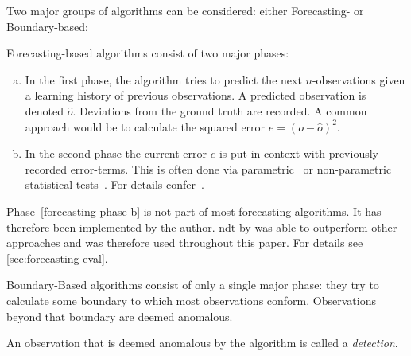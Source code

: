 Two major groups of algorithms can be considered: either Forecasting- or
Boundary-based:
\begin{definition}\label{def:forecasting-based-algo}
    Forecasting-based algorithms consist of two major phases:
    \begin{enumerate}[a.)]
        \item In the first phase, the algorithm tries to predict the next \(n\)-observations
        given a learning history of previous observations. A predicted observation
        is denoted \(\hat{o}\). Deviations from the ground truth are recorded.
        A common approach would be to calculate the squared error \(e = {\left(o - \hat{o}\right)}^2\).
        \item In the second phase the current-error \(e\) is put in context with
        previously recorded error-terms. This is often done via 
        parametric~\cite{Malhotra.2015,Ahmad.2017,Guo.2016,Malhotra.2016,Shipmon.2017,Chauhan.2015} or 
        non-parametric statistical tests~\cite{Zhu.2017,Hundman.2018,Maimo.2018,Su.2019}.
        For details confer~\cite{Zietlow.2020}.\label{forecasting-phase-b}
    \end{enumerate}
    Phase~\ref{forecasting-phase-b} is not part of most forecasting algorithms.
    It has therefore been implemented by the author. \acrfull{ndt} by
    \textcite{Hundman.2018} was able to outperform other approaches and was
    therefore used throughout this paper. For details see \cref{sec:forecasting-eval}.
\end{definition}

\begin{definition}\label{def:boundary-based-algo}
    Boundary-Based algorithms consist of only a single major phase:
    they try to calculate some boundary to which most observations conform.
    Observations beyond that boundary are deemed anomalous.
\end{definition}

\begin{definition}[Detection]\label{def:detection}
    An observation that is deemed anomalous by the algorithm is called a
    \textit{detection}.
\end{definition}
